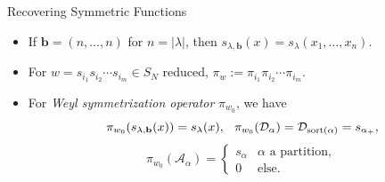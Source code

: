 \documentclass[dvipsnames]{beamer}
\DeclareMathOperator{\sort}{sort}
\newcommand{\Acal}{{\mathcal A}}
\newcommand{\Dcal}{{\mathcal D}}
\newcommand{\bb}{{\mathbf b}}
\theoremstyle{definition}
\newcounter{c}
\begin{document}
\begin{frame}{Recovering Symmetric Functions}
  \begin{itemize}
  \item If \(\bb = (n,\ldots,n)\) for \(n = |\lambda|\), then
    \(s_{\lambda,\bb}(x) = s_\lambda(x_1,\ldots,x_n)\).\pause
  \item For $w=s_{i_1}s_{i_2}\cdots s_{i_m} \in S_{N}$ reduced,
    $\pi_w := \pi_{i_1}\pi_{i_2}\cdots \pi_{i_m}.$\pause
  \item For \emph{Weyl symmetrization operator} \(\pi_{w_0}\), we have \[
        \pi_{w_0}(s_{\lambda,\bb}(x)) = s_\lambda(x), \hspace{0.1in}
        \pi_{w_0}(\Dcal_\alpha) = \Dcal_{\sort(\alpha)} = s_{\alpha_+},
      \]
      \[
        \pi_{w_0}(\Acal_\alpha) =
        \begin{cases}
          s_\alpha & \alpha \text{ a partition},\\
          0 & \text{else.}
        \end{cases}
    \]
  \end{itemize}
\end{frame}
\end{document}
